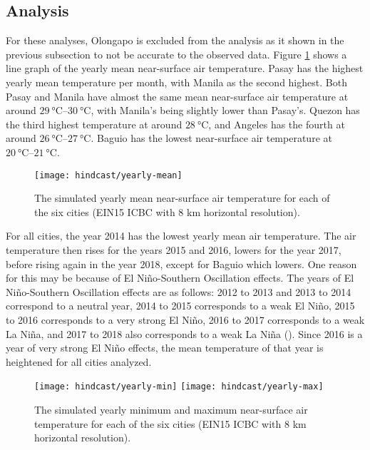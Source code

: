 	\subsection{Analysis}
		For these analyses, Olongapo is excluded from the analysis as it shown in the previous subsection to not be accurate to the observed data.
		Figure \ref{fig:hindcast-yearly-mean} shows a line graph  of the yearly mean near-surface air temperature.		
		Pasay has the highest yearly mean temperature per month, with Manila as the second highest.
		Both Pasay and Manila have almost the same mean near-surface air temperature at around $\qtyrange{29}{30}{\degreeCelsius}$, with Manila's being slightly lower than Pasay's.
		Quezon has the third highest temperature at around $\qty{28}{\degreeCelsius}$, 
			and Angeles has the fourth at around $\qtyrange{26}{27}{\degreeCelsius}$.
		Baguio has the lowest near-surface air temperature at $\qtyrange{20}{21}{\degreeCelsius}$.
		
		\begin{figure}	
			\centering
			\texttt{[image: hindcast/yearly-mean]}
			\caption{
				The simulated yearly mean near-surface air temperature for each of the six cities (EIN15 ICBC with 8 km horizontal resolution).
			}
			\label{fig:hindcast-yearly-mean}
		\end{figure}

		For all cities, the year 2014 has the lowest yearly mean air temperature.
		The air temperature then rises for the years 2015 and 2016,
			lowers for the year 2017,
			before rising again in the year 2018,
				except for Baguio which lowers.
		One reason for this may be because of El Niño-Southern Oscillation effects.
		The years of El Niño-Southern Oscillation effects are as follows:
			2012 to 2013 and 2013 to 2014 correspond to a neutral year,
			2014 to 2015 corresponds to a weak El Niño,
			2015 to 2016 corresponds to a very strong El Niño,
			2016 to 2017 corresponds to a weak La Niña,
			and
			2017 to 2018 also corresponds to a weak La Niña
			(\cite{Null2025}).
		Since 2016 is a year of very strong El Niño effects, the mean temperature of that year is heightened for all cities analyzed.

		\begin{figure}	
			\centering
			\texttt{[image: hindcast/yearly-min]}
			\texttt{[image: hindcast/yearly-max]}
			\caption{
				The simulated yearly minimum and maximum near-surface air temperature for each of the six cities (EIN15 ICBC with 8 km horizontal resolution).
			}
			\label{fig:hindcast-yearly-min-max}
		\end{figure}
	
